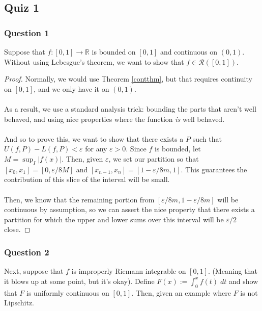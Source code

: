 \documentclass[12pt]{article}
\theoremstyle{plain}
\theoremstyle{definition}
\theoremstyle{remark}
\begin{document}
\subsection{Quiz 1}

\subsubsection{Question 1}

Suppose that $f: [0,1]\rightarrow \mathbb{R}$ is bounded on $[0,1]$ and continuous on $(0,1)$. Without using Lebesgue's theorem, we want to show that $f\in\mathscr{R}([0,1])$.
\begin{proof}
Normally, we would use Theorem \ref{contthm}, but that requires continuity on $[0,1]$, and we only have it on $(0,1)$.
\\
\\
As a result, we use a standard analysis trick: bounding the parts that aren't well behaved, and using nice properties where the function \emph{is} well behaved.
\\
\\
And so to prove this, we want to show that there exists a $P$ such that $U(f,P)-L(f,P)<\varepsilon$ for any $\varepsilon>0$. Since $f$ is bounded, let $M = \sup_I |f(x)|$. Then, given $\varepsilon$, we set our partition so that $[x_0, x_1] = [0, \varepsilon/8M]$ and $[x_{n-1}, x_n] = [1-\varepsilon/8m, 1]$. This guarantees the contribution of this slice of the interval will be small.
\\
\\
Then, we know that the remaining portion from $[\varepsilon/8m, 1-\varepsilon/8m]$ will be continuous by assumption, so we can assert the nice property that there exists a partition for which the upper and lower sums over this interval will be $\varepsilon/2$ close.
\end{proof}

\subsubsection{Question 2}

Next, suppose that $f$ is improperly Riemann integrable on $[0,1]$. (Meaning that it blows up at some point, but it's okay). Define $F(x):=\int^x_0 f(t)\;dt$ and show that $F$ is uniformly continuous on $[0,1]$. Then, given an example where $F$ is not Lipschitz.
\end{document}
